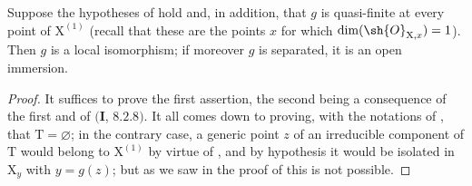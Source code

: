 \begin{corollary}[21.12.13]
\label{IV.21.12.13}
Suppose the hypotheses of  hold and, in addition, that $g$ is quasi-finite at every point of $\mathrm{X}^{(1)}$ (recall that these are the points $x$ for which $\dim(\sh{O}_{\mathrm{X},x})=1$).  Then $g$ is a local isomorphism; if moreover $g$ is separated, it is an open immersion.
\end{corollary}

\begin{proof}
It suffices to prove the first assertion, the second being a consequence of the first and of $(\mathbf{I}$, $8.2.8)$.
It all comes down to proving, with the notations of , that $\mathrm{T}=\varnothing$; in the contrary case, a generic point $z$ of an irreducible component of $\mathrm{T}$ would belong to $\mathrm{X}^{(1)}$ by virtue of , and by hypothesis it would be isolated in $\mathrm{X}_y$ with $y=g(z)$; but as we saw in the proof of  this is not possible.
\end{proof}

